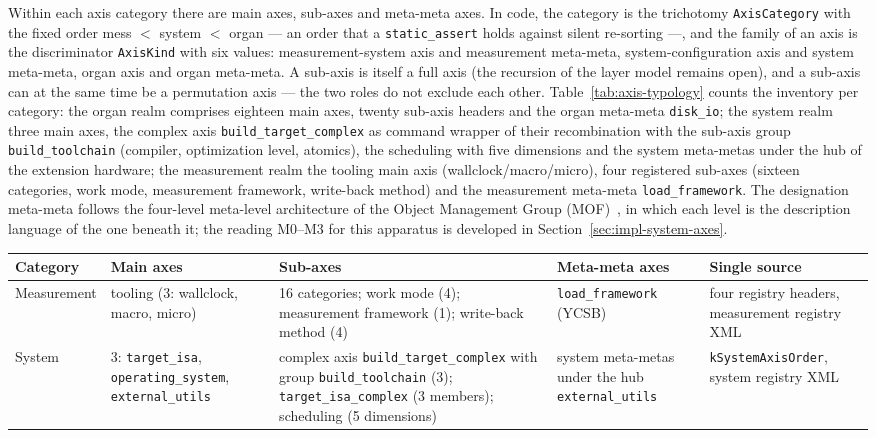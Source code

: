 \begin{nurlang}
Within each axis category there are main axes, sub-axes and meta-meta axes. In code, the category is
the trichotomy \texttt{AxisCategory} with the fixed order mess $<$ system $<$ organ --- an order that a
\texttt{static\_assert} holds against silent re-sorting ---, and the family of an axis is the
discriminator \texttt{AxisKind} with six values: measurement-system axis and measurement meta-meta,
system-configuration axis and system meta-meta, organ axis and organ meta-meta. A sub-axis is itself a
full axis (the recursion of the layer model remains open), and a sub-axis can at the same time be a
permutation axis --- the two roles do not exclude each other. Table~\ref{tab:axis-typology} counts the
inventory per category: the organ realm comprises eighteen main axes, twenty sub-axis headers and the
organ meta-meta \texttt{disk\_io}; the system realm three main axes, the complex axis
\texttt{build\_target\_complex} as command wrapper of their recombination with the sub-axis group
\texttt{build\_toolchain} (compiler, optimization level, atomics), the scheduling with five dimensions
and the system meta-metas under the hub of the extension hardware; the measurement realm the tooling
main axis (wallclock/macro/micro), four registered sub-axes (sixteen categories, work mode, measurement
framework, write-back method) and the measurement meta-meta \texttt{load\_framework}. The designation
meta-meta follows the four-level meta-level architecture of the Object Management Group
(MOF)~\cite{omg2016mof}, in which each level is the description language of the one beneath it; the
reading M0--M3 for this apparatus is developed in Section~\ref{sec:impl-system-axes}.
\begin{table}[htbp]\centering\footnotesize
\begin{tabular}{@{}lp{2.5cm}p{4.15cm}p{2.7cm}p{3.2cm}@{}}
\toprule
Category & Main axes & Sub-axes & Meta-meta axes & Single source \\
\midrule
Measurement & tooling (3: wallclock, macro, micro) & 16 categories; work mode (4); measurement framework (1); write-back method (4) & \texttt{load\_framework} (YCSB) & four registry headers, measurement registry XML \\
System & 3: \texttt{target\_\allowbreak{}isa}, \texttt{operating\_\allowbreak{}system}, \texttt{external\_\allowbreak{}utils} & complex axis \texttt{build\_target\_complex} with group \texttt{build\_toolchain} (3); \texttt{target\_isa\_complex} (3 members); scheduling (5 dimensions) & system meta-metas under the hub \texttt{external\_utils} & \texttt{kSystemAxisOrder}, system registry XML \\

\end{tabular}
\end{table}
\end{nurlang}
